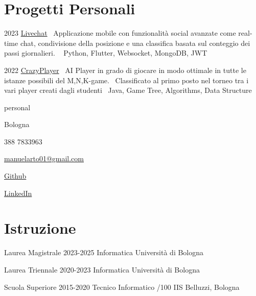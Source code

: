 \documentclass{tccv}
\begin{document}
\section{Progetti Personali}

\begin{yearlist}

\item{2023}
     {\href{https://github.com/manuelarto/livechat}{Livechat}}
     {\textbullet~Applicazione mobile con funzionalità social avanzate come real-time chat, condivisione della posizione e una classifica basata sul conteggio dei passi giornalieri. \newline
    \textbullet~ Python, Flutter, Websocket, MongoDB, JWT}
\item{2022}
     {\href{https://github.com/manuelarto/crazyplayer}{CrazyPlayer}}
     {\textbullet~AI Player in grado di giocare in modo ottimale in tutte le istanze possibili del M,N,K-game. \newline
     \textbullet~Classificato al primo posto nel torneo tra i vari player creati dagli studenti  \newline
    \textbullet~Java, Game Tree, Algorithms, Data Structure}
\end{yearlist}


\newpage


\begin{keyvaluelist}{personal}
    \item[\faHome] Bologna
    \item[\faPhone] 388 7833963
    \item[\faEnvelope] \href{mailto:manuelarto01@gmail.com}{manuelarto01@gmail.com}
    \item[\faGithub] \href{https://github.com/manuelarto}{Github}
    \item[\faLinkedin] \href{https://www.linkedin.com/in/manuel-arto-696012203/}{LinkedIn}
\end{keyvaluelist}


\section{Istruzione}

\begin{yearlist}

\item[Laurea Magistrale]{2023-2025}
     {Informatica}
     {Università di Bologna}

\item[Laurea Triennale]{2020-2023}
    {Informatica}
    {Università di Bologna}

\item[Scuola Superiore]{2015-2020}
    {Tecnico Informatico /100}
    {IIS Belluzzi, Bologna}

\end{yearlist}
\end{document}
